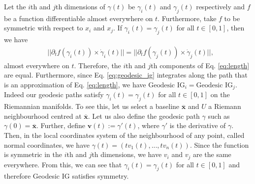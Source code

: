 Let the $i$th and $j$th dimensions of $\gamma(t)$ be $\gamma_i(t)$ and $\gamma_j(t)$ respectively and $f$ be a function differentiable almost everywhere on $t$. Furthermore, take $f$ to be symmetric with respect to $x_i$ and $x_j$. If $\gamma_i(t) = \gamma_j(t)$ for all $t \in [0,1]$, then we have 
\begin{equation}
	\begin{split}
		& ||\partial_t f(\gamma_i(t)) \times \dot\gamma_i(t)|| = ||\partial_t f(\gamma_j(t)) \times \dot\gamma_j(t)||,
	\end{split}
	\label{eq:norms}
\end{equation}
almost everywhere on $t$. Therefore, the $i$th and $j$th components of Eq. \ref{eq:length} are equal. Furthermore, since  Eq. \ref{eq:geodesic_ig} integrates along the path that is an approximation of Eq. \ref{eq:length}, we have $\textrm{Geodesic IG}_i = \textrm{Geodesic IG}_j$. Indeed our geodesic paths satisfy  $\gamma_i(t) = \gamma_j(t)$ for all $t \in [0,1]$ on the Riemannian manifolds. To see this, let us select a baseline $\overline{\textbf{x}}$ and $U$ a Riemann neighbourhood centred at $\overline{\textbf{x}}$. Let us also define the geodesic path $\gamma$ such as $\gamma(0) = \overline{\textbf{x}}$. Further, define $\textbf{v}(t):=\gamma'(t)$, where $\gamma'$ is the derivative of $\gamma$. Then, in the local coordinates system of the neighbourhood of any point, called normal coordinates, we have $\gamma(t) = (tv_1(t), ..., tv_n(t))$. Since the function is symmetric in the $i$th and $j$th dimensions, we have $v_i$ and $v_j$ are the same everywhere. From this, we can see that $\gamma_i(t) = \gamma_j(t)$ for all $t \in [0,1]$ and therefore Geodesic IG satisfies symmetry.